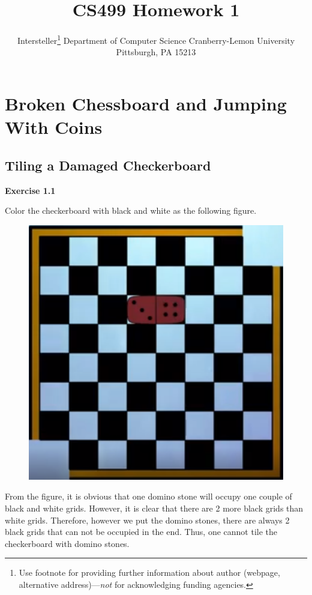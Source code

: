 \documentclass{article} %
\title{CS499 Homework 1}
\author{
	Intersteller\thanks{ Use footnote for providing further information
		about author (webpage, alternative address)---\emph{not} for acknowledging
		funding agencies.}
	Department of Computer Science
	Cranberry-Lemon University
	Pittsburgh, PA 15213
}
\begin{document}
	
	
	\maketitle
	
	\section{Broken Chessboard and Jumping With Coins}
	\subsection{Tiling a Damaged Checkerboard}
	\textbf{Exercise 1.1}\par
	Color the checkerboard with black and white as the following figure.
	\begin{figure}[H]
		\centering
		\includegraphics[scale=0.6]{1-1.png}
		\caption{}
		\label{fig:1}
	\end{figure}
	From the figure, it is obvious that one domino stone will occupy one couple of black and white grids. However, it is clear that there are 2 more black grids than white grids. Therefore, however we put the domino stones, there are always 2 black grids that can not be occupied in the end. Thus, one cannot tile the checkerboard with domino stones.\\
	
\end{document}
